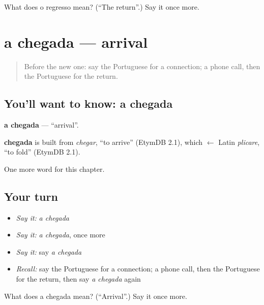 \begin{tcolorbox}[breakable,colback=teal!4,colframe=teal!35!black,title={Before you move on}]
What does o regresso mean? (\textquotedblleft{}The return\textquotedblright{}.) Say it once more.
\end{tcolorbox}
\section[a chegada]{a chegada — arrival}

\label{lesson:PT-C166-chegada}



\begin{quote}
Before the new one: say the Portuguese for a connection; a phone call, then the Portuguese for the return.
\end{quote}

\subsection*{You'll want to know: a chegada}
\textbf{a chegada} — \textquotedblleft{}arrival\textquotedblright{}.

\begin{cousinweb}
\textbf{chegada} is built from \emph{chegar}, \textquotedblleft{}to arrive\textquotedblright{} (EtymDB 2.1), which $\leftarrow$ Latin \emph{plicare}, \textquotedblleft{}to fold\textquotedblright{} (EtymDB 2.1).
\end{cousinweb}

\begin{grammarlens}[title={What you've built}]
One more word for this chapter.
\end{grammarlens}

\subsection*{Your turn}
\begin{itemize}
\raggedright
  \item \emph{Say it:} \emph{a chegada}
  \item \emph{Say it:} \emph{a chegada}, once more
  \item \emph{Say it:} say \emph{a chegada}
  \item \emph{Recall:} say the Portuguese for a connection; a phone call, then the Portuguese for the return, then say \emph{a chegada} again
\end{itemize}

\begin{tcolorbox}[breakable,colback=teal!4,colframe=teal!35!black,title={Before you move on}]
What does a chegada mean? (\textquotedblleft{}Arrival\textquotedblright{}.) Say it once more.
\end{tcolorbox}
